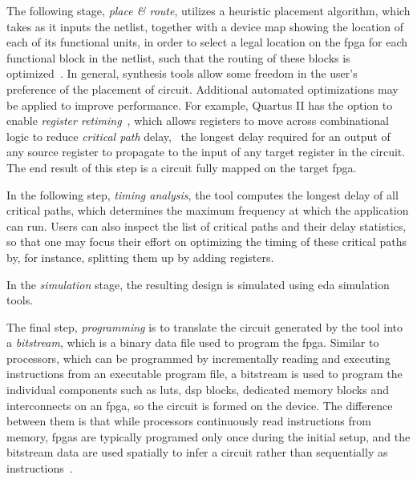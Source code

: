 The following stage, \emph{place \& route}, utilizes a heuristic placement
algorithm, which takes as it inputs the netlist, together with a device map
showing the location of each of its functional units, in order to select a
legal location on the \gls{fpga} for each functional block in the netlist,
such that the routing of these blocks is optimized~\cite{betz08}.  In general,
synthesis tools allow some freedom in the user's preference of the placement
of circuit.  Additional automated optimizations may be applied to improve
performance.  For example, Quartus II has the option to enable \emph{register
retiming}~\cite{quartus}, which allows registers to move across combinational
logic to reduce \emph{critical path} delay, \ie~the longest delay required
for an output of any source register to propagate to the input of any target
register in the circuit.  The end result of this step is a circuit fully mapped
on the target \gls{fpga}\@.

In the following step, \emph{timing analysis}, the tool computes the longest
delay of all critical paths, which determines the maximum frequency at which
the application can run.  Users can also inspect the list of critical paths and
their delay statistics, so that one may focus their effort on optimizing the
timing of these critical paths by, for instance, splitting them up by adding
registers.

In the \emph{simulation} stage, the resulting design is simulated using
\gls{eda} simulation tools.

The final step, \emph{programming} is to translate the circuit generated by the
tool into a \emph{bitstream}, which is a binary data file used to program the
\gls{fpga}\@.  Similar to processors, which can be programmed by incrementally
reading and executing instructions from an executable program file, a bitstream
is used to program the individual components such as \glspl{lut}, \gls{dsp}
blocks, dedicated memory blocks and interconnects on an \gls{fpga}, so the
circuit is formed on the device.  The difference between them is that while
processors continuously read instructions from memory, \glspl{fpga} are
typically programed only once during the initial setup, and the bitstream
data are used spatially to infer a circuit rather than sequentially as
instructions~\cite{guccione08}.
